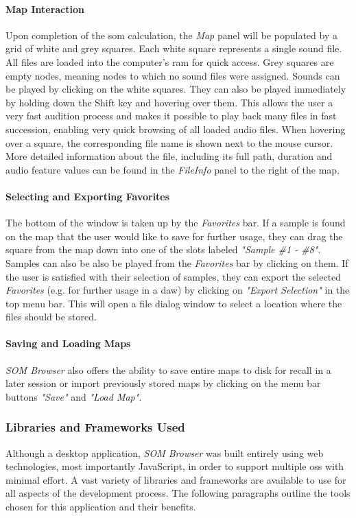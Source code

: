\paragraph*{Map Interaction}
Upon completion of the \gls{som} calculation, the \textit{Map} panel will be
populated by a grid of white and grey squares. Each white square represents a
single sound file. All files are loaded into the computer's \gls{ram} for quick
access. Grey squares are empty nodes, meaning nodes to which no sound
files were assigned. Sounds can be played by clicking on the white squares.
They can also be played immediately by holding down the Shift key and hovering
over them.
This allows the user a very fast audition process and makes it
possible to play back many files in fast succession, enabling very quick
browsing of all loaded audio files. When hovering over a square, the
corresponding file name is shown next to the mouse cursor. More detailed
information about the file, including its full path, duration and audio feature
values can be found in the \textit{FileInfo} panel to the right of the map.

\paragraph*{Selecting and Exporting Favorites}
The bottom of the window is taken up by the \textit{Favorites} bar. If a sample
is found on the map that the user would like to save for further usage, they can
drag the square from the map down into one of the slots labeled
\textit{"Sample \#1 - \#8"}. Samples can also be also be played from the
\textit{Favorites} bar by clicking on them. If the user is satisfied with their
selection of samples, they can export the selected \textit{Favorites} (e.g. for
further usage in a \gls{daw}) by clicking on \textit{"Export Selection"} in the
top menu bar. This will open a file dialog window to select a location where the
files should be stored.

\paragraph*{Saving and Loading Maps}
\textit{SOM Browser} also offers the ability to save entire maps to disk for
recall in a later session or import previously stored maps by clicking on the
menu bar buttons \textit{"Save"} and \textit{"Load Map"}.

\subsubsection{Libraries and Frameworks Used}
\label{subsubsec:som-browser_libraries}
Although a desktop application, \textit{SOM Browser} was built entirely using
web technologies, most importantly JavaScript, in order to support multiple
\glspl{os} with minimal effort. A vast variety of libraries and frameworks are
available to use for all aspects of the development process. The following
paragraphs outline the tools chosen for this application and their benefits.

